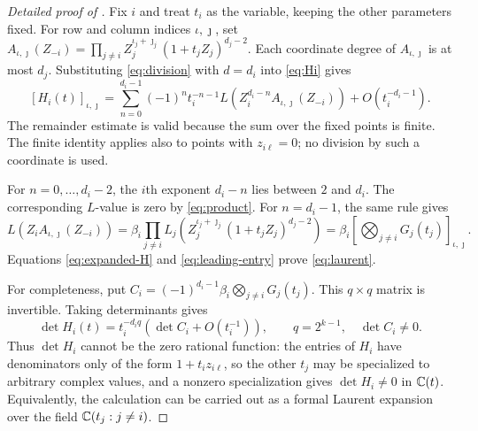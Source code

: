 \begin{proof}[Detailed proof of ]
Fix $i$ and treat $t_i$ as the variable, keeping the other parameters
fixed. For row and column indices $\iota,\jmath$, set
$A_{\iota,\jmath}(Z_{-i})=
\prod_{j\ne i}Z_j^{\iota_j+\jmath_j}(1+t_jZ_j)^{d_j-2}$.
Each coordinate degree of $A_{\iota,\jmath}$ is at most $d_j$.
Substituting \eqref{eq:division} with $d=d_i$ into \eqref{eq:Hi}
gives
\begin{equation}\label{eq:expanded-H}
[H_i(t)]_{\iota,\jmath}
=\sum_{n=0}^{d_i-1}(-1)^n t_i^{-n-1}
L\!\left(Z_i^{d_i-n}A_{\iota,\jmath}(Z_{-i})\right)
+O(t_i^{-d_i-1}).
\end{equation}
The remainder estimate is valid because the sum over the fixed
points is finite. The finite identity applies also to points with
$z_{i\ell}=0$; no division by such a coordinate is used.

For $n=0,\ldots,d_i-2$, the $i$th exponent $d_i-n$ lies between
$2$ and $d_i$. The corresponding $L$-value is zero by
\eqref{eq:product}. For $n=d_i-1$, the same rule gives
\begin{equation}\label{eq:leading-entry}
L\!\left(Z_i A_{\iota,\jmath}(Z_{-i})\right)
=\beta_i\prod_{j\ne i}
L_j\!\left(Z_j^{\iota_j+\jmath_j}(1+t_jZ_j)^{d_j-2}\right)
=\beta_i\left[\bigotimes_{j\ne i}G_j(t_j)\right]_{\iota,\jmath}.
\end{equation}
Equations \eqref{eq:expanded-H} and \eqref{eq:leading-entry}
prove \eqref{eq:laurent}.

For completeness, put
$C_i=(-1)^{d_i-1}\beta_i\bigotimes_{j\ne i}G_j(t_j)$.
This $q\times q$ matrix is invertible. Taking determinants gives
\begin{equation}\label{eq:det-laurent}
\det H_i(t)=t_i^{-d_iq}
\left(\det C_i+O(t_i^{-1})\right),
\qquad q=2^{k-1},\quad \det C_i\ne0.
\end{equation}
Thus $\det H_i$ cannot be the zero rational function: the entries of
$H_i$ have denominators only of the form $1+t_iz_{i\ell}$, so the
other $t_j$ may be specialized to arbitrary complex values, and a
nonzero specialization gives $\det H_i\ne0$ in $\mathbb C(t)$. Equivalently,
the calculation can be carried out as a formal Laurent expansion
over the field $\mathbb C(t_j:j\ne i)$.
\end{proof}
